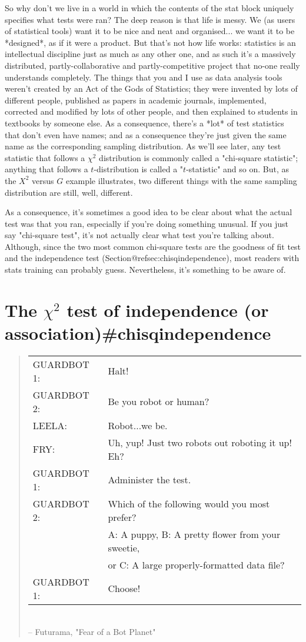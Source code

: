 So why don't we live in a world in which the contents of the stat block uniquely specifies what tests were ran? The deep reason is that life is messy. We (as users of statistical tools) want it to be nice and neat and organised... we want it to be *designed*, as if it were a product. But that's not how life works: statistics is an intellectual discipline just as much as any other one, and as such it's a massively distributed, partly-collaborative and partly-competitive project that no-one really understands completely. The things that you and I use as data analysis tools weren't created by an Act of the Gods of Statistics; they were invented by lots of different people, published as papers in academic journals, implemented, corrected and modified by lots of other people, and then explained to students in textbooks by someone else. As a consequence, there's a *lot* of test statistics that don't even have names; and as a consequence they're just given the same name as the corresponding sampling distribution. As we'll see later, any test statistic that follows a $\chi^2$ distribution is commonly called a "chi-square statistic"; anything that follows a $t$-distribution is called a "$t$-statistic" and so on. But, as the $X^2$ versus $G$ example illustrates, two different things with the same sampling distribution are still, well, different. 

As a consequence, it's sometimes a good idea to be clear about what the actual test was that you ran, especially if you're doing something unusual. If you just say "chi-square test", it's not actually clear what test you're talking about. Although, since the two most common chi-square tests are the goodness of fit test and the independence test (Section@refsec:chisqindependence), most readers with stats training can probably guess. Nevertheless, it's something to be aware of.


\section{The $\chi^2$ test of independence (or association){#chisqindependence}}

\begin{quote}
{\it
\begin{tabular}{ll}
GUARDBOT 1:& Halt! \\
GUARDBOT 2:& Be you robot or human? \\
LEELA:& Robot...we be. \\
FRY:& Uh, yup! Just two robots out roboting it up!  Eh? \\
GUARDBOT 1:& Administer the test. \\
GUARDBOT 2:& Which of the following would you most prefer? \\
& A: A puppy, B: A pretty flower from your sweetie, \\
& or C: A large properly-formatted data file? \\
GUARDBOT 1:& Choose! \\
\end{tabular}
} \\
\hspace*{2cm} -- Futurama, "Fear of a Bot Planet"
\end{quote}


